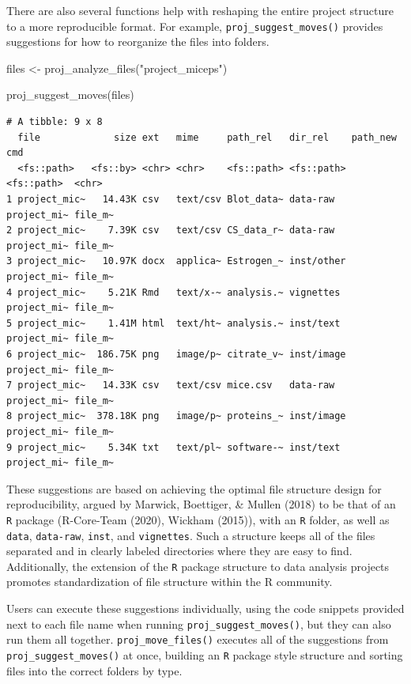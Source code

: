 \documentclass[12pt,twoside]{reedthesis}
\newenvironment{Shaded}{\begin{snugshade}}{\end{snugshade}}
\newcommand{\FunctionTok}[1]{\textcolor[rgb]{0.00,0.00,0.00}{#1}}
\newcommand{\NormalTok}[1]{#1}
\newcommand{\OtherTok}[1]{\textcolor[rgb]{0.56,0.35,0.01}{#1}}
\newcommand{\StringTok}[1]{\textcolor[rgb]{0.31,0.60,0.02}{#1}}
\begin{document}
There are also several functions help with reshaping the entire project structure to a more reproducible format. For example, \texttt{proj\_suggest\_moves()} provides suggestions for how to reorganize the files into folders.
\begin{Shaded}
\begin{Highlighting}[]
\NormalTok{files }\OtherTok{\textless{}{-}} \FunctionTok{proj\_analyze\_files}\NormalTok{(}\StringTok{"project\_miceps"}\NormalTok{)}

\FunctionTok{proj\_suggest\_moves}\NormalTok{(files)}
\end{Highlighting}
\end{Shaded}
\footnotesize
\begin{verbatim}
# A tibble: 9 x 8
  file             size ext   mime     path_rel   dir_rel    path_new    cmd    
  <fs::path>   <fs::by> <chr> <chr>    <fs::path> <fs::path> <fs::path>  <chr>  
1 project_mic~   14.43K csv   text/csv Blot_data~ data-raw   project_mi~ file_m~
2 project_mic~    7.39K csv   text/csv CS_data_r~ data-raw   project_mi~ file_m~
3 project_mic~   10.97K docx  applica~ Estrogen_~ inst/other project_mi~ file_m~
4 project_mic~    5.21K Rmd   text/x-~ analysis.~ vignettes  project_mi~ file_m~
5 project_mic~    1.41M html  text/ht~ analysis.~ inst/text  project_mi~ file_m~
6 project_mic~  186.75K png   image/p~ citrate_v~ inst/image project_mi~ file_m~
7 project_mic~   14.33K csv   text/csv mice.csv   data-raw   project_mi~ file_m~
8 project_mic~  378.18K png   image/p~ proteins_~ inst/image project_mi~ file_m~
9 project_mic~    5.34K txt   text/pl~ software-~ inst/text  project_mi~ file_m~
\end{verbatim}
\normalsize

These suggestions are based on achieving the optimal file structure design for reproducibility, argued by Marwick, Boettiger, \& Mullen (2018) to be that of an \texttt{R} package (R-Core-Team (2020), Wickham (2015)), with an \texttt{R} folder, as well as \texttt{data}, \texttt{data-raw}, \texttt{inst}, and \texttt{vignettes}. Such a structure keeps all of the files separated and in clearly labeled directories where they are easy to find. Additionally, the extension of the \texttt{R} package structure to data analysis projects promotes standardization of file structure within the R community.

Users can execute these suggestions individually, using the code snippets provided next to each file name when running \texttt{proj\_suggest\_moves()}, but they can also run them all together. \texttt{proj\_move\_files()} executes all of the suggestions from \texttt{proj\_suggest\_moves()} at once, building an \texttt{R} package style structure and sorting files into the correct folders by type.
\end{document}
